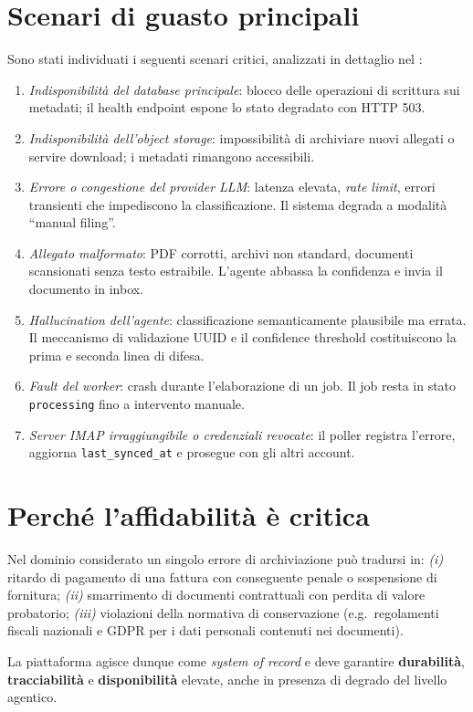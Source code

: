 \section{Scenari di guasto principali}
\label{sec:scenari_guasto}

Sono stati individuati i seguenti scenari critici, analizzati in dettaglio nel
:

\begin{enumerate}[leftmargin=*]
    \item \emph{Indisponibilit\`a del database principale}: blocco delle
          operazioni di scrittura sui metadati; il health endpoint espone lo stato
          degradato con HTTP 503.
    \item \emph{Indisponibilit\`a dell'object storage}: impossibilit\`a di
          archiviare nuovi allegati o servire download; i metadati rimangono
          accessibili.
    \item \emph{Errore o congestione del provider LLM}: latenza elevata,
          \emph{rate limit}, errori transienti che impediscono la classificazione.
          Il sistema degrada a modalit\`a ``manual filing''.
    \item \emph{Allegato malformato}: PDF corrotti, archivi non standard, documenti
          scansionati senza testo estraibile. L'agente abbassa la confidenza e
          invia il documento in inbox.
    \item \emph{Hallucination dell'agente}: classificazione semanticamente plausibile
          ma errata. Il meccanismo di validazione UUID e il confidence threshold
          costituiscono la prima e seconda linea di difesa.
    \item \emph{Fault del worker}: crash durante l'elaborazione di un job.
          Il job resta in stato \texttt{processing} fino a intervento manuale.
    \item \emph{Server IMAP irraggiungibile o credenziali revocate}: il poller
          registra l'errore, aggiorna \texttt{last\_synced\_at} e prosegue con
          gli altri account.
\end{enumerate}

\section{Perch\'e l'affidabilit\`a \`e critica}
\label{sec:affidabilita_critica}

Nel dominio considerato un singolo errore di archiviazione pu\`o tradursi in:
\emph{(i)} ritardo di pagamento di una fattura con conseguente penale o sospensione
di fornitura; \emph{(ii)} smarrimento di documenti contrattuali con perdita di valore
probatorio; \emph{(iii)} violazioni della normativa di conservazione (e.g.\ regolamenti
fiscali nazionali e GDPR per i dati personali contenuti nei documenti).

La piattaforma agisce dunque come \emph{system of record} e deve garantire
\textbf{durabilit\`a}, \textbf{tracciabilit\`a} e \textbf{disponibilit\`a} elevate,
anche in presenza di degrado del livello agentico.
